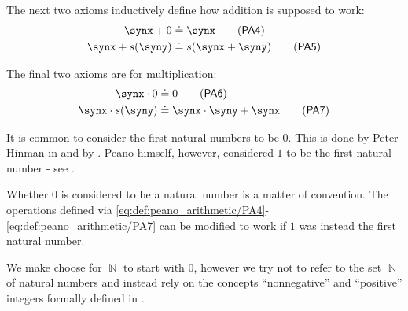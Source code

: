 \begin{definition}
  \begin{thmenum}[resume=def:peano_arithmetic]
     The next two axioms inductively define how addition is supposed to work:
    \begin{align}
      \synx + 0       &\syneq \synx           \label{eq:def:peano_arithmetic/PA4}\tag{\logic{PA4}} \\
      \synx + s(\syny) &\syneq s(\synx + \syny) \label{eq:def:peano_arithmetic/PA5}\tag{\logic{PA5}}
    \end{align}

     The final two axioms are for multiplication:
    \begin{align}
      \synx \cdot 0       &\syneq 0                    \label{eq:def:peano_arithmetic/PA6}\tag{\logic{PA6}} \\
      \synx \cdot s(\syny) &\syneq \synx \cdot \syny + \synx \label{eq:def:peano_arithmetic/PA7}\tag{\logic{PA7}}
    \end{align}
  \end{thmenum}
\end{definition}

\begin{remark}\label{rem:peano_arithmetic_zero}
  It is common to consider the first natural numbers to be \( 0 \). This is done by Peter Hinman in  and by . Peano himself, however, considered \( 1 \) to be the first natural number - see \cite[1]{Peano1889PA}.

  Whether \( 0 \) is considered to be a natural number is a matter of convention. The operations defined via \eqref{eq:def:peano_arithmetic/PA4}-\eqref{eq:def:peano_arithmetic/PA7} can be modified to work if \( 1 \) was instead the first natural number.

  We make choose for \( \BbbN \) to start with \( 0 \), however we try not to refer to the set \( \BbbN \) of natural numbers and instead rely on the concepts \enquote{nonnegative} and \enquote{positive} integers formally defined in .
\end{remark}

